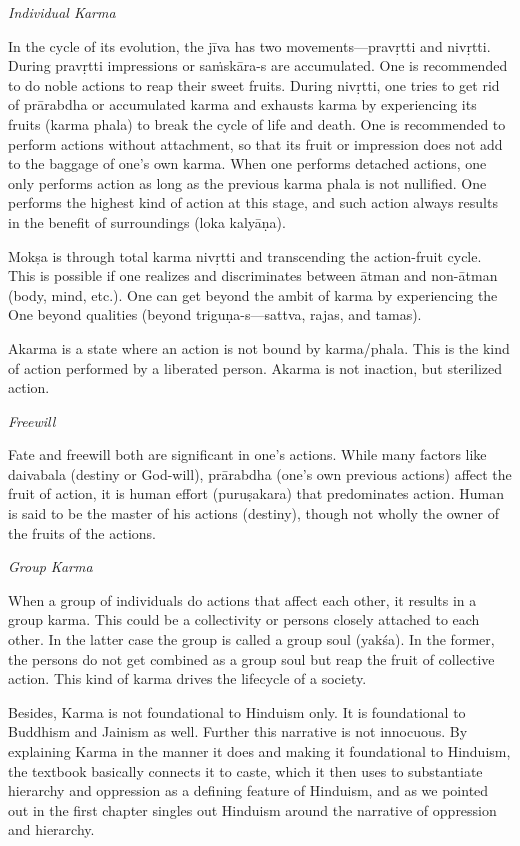 \noindent
\textit{Individual Karma} 

In the cycle of its evolution, the jīva has two movements—pravṛtti and nivṛtti. During pravṛtti impressions or saṁskāra-s are accumulated. One is recommended to do noble actions to reap their sweet fruits. During nivṛtti, one tries to get rid of prārabdha or accumulated karma and exhausts karma by experiencing its fruits (karma phala) to break the cycle of life and death. One is recommended to perform actions without attachment, so that its fruit or impression does not add to the baggage of one's own karma. When one performs detached actions, one only performs action as long as the previous karma phala is not nullified. One performs the highest kind of action at this stage, and such action always results in the benefit of surroundings (loka kalyāṇa). 

Mokṣa is through total karma nivṛtti and transcending the action-fruit cycle. This is possible if one realizes and discriminates between ātman and non-ātman (body, mind, etc.). One can get beyond the ambit of karma by experiencing the One beyond qualities (beyond triguṇa-s—sattva, rajas, and tamas).

Akarma is a state where an action is not bound by karma/phala. This is the kind of action performed by a liberated person. Akarma is not inaction, but sterilized action.

\noindent
\textit{Freewill} 

Fate and freewill both are significant in one's actions. While many factors like daivabala (destiny or God-will), prārabdha (one's own previous actions) affect the fruit of action, it is human effort (puruṣakara) that predominates action. Human is said to be the master of his actions (destiny), though not wholly the owner of the fruits of the actions.

\noindent
\textit{Group Karma} 

When a group of individuals do actions that affect each other, it results in a group karma. This could be a collectivity or persons closely attached to each other. In the latter case the group is called a group soul (yakśa). In the former, the persons do not get combined as a group soul but reap the fruit of collective action. This kind of karma drives the lifecycle of a society.

Besides, Karma is not foundational to Hinduism only. It is foundational to Buddhism and Jainism as well. Further this narrative is not innocuous. By explaining Karma in the manner it does and making it foundational to Hinduism, the textbook basically connects it to caste, which it then uses to substantiate hierarchy and oppression as a defining feature of Hinduism, and as we pointed out in the first chapter singles out Hinduism around the narrative of oppression and hierarchy.

